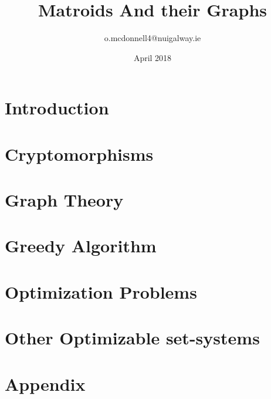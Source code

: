 \documentclass{article}
\title{Matroids And their Graphs}
\author{o.mcdonnell4@nuigalway.ie }
\date{April 2018}
\theoremstyle{plain}
\theoremstyle{definition}
\theoremstyle{remark}
\begin{document}
 
\maketitle
 


\section{Introduction}





\section{Cryptomorphisms}






\section{Graph Theory}


\section{Greedy Algorithm}


\section{Optimization Problems}





\section{Other Optimizable set-systems}




\section{Appendix}



\end{document}
